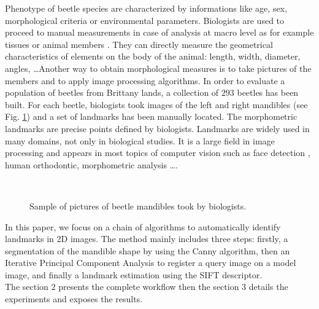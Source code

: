 \documentclass[twoside,twocolumn,10pt]{article}
\begin{document}
\copyrightspace
  Phenotype of beetle species are characterized by informations like
  age, sex, morphological criteria or environmental parameters. Biologists are
  used to proceed to manual measurements in case of
  analysis at macro level as for example tissues or animal members
  \cite{houle2003automated} \cite{bromiley2014semi}.
  They can directly measure the geometrical characteristics of elements on the body of the animal: length,
  width, diameter, angles, \ldots Another way to obtain morphological
  measures is to take pictures of the members and to apply image processing algorithms. In order to
  evaluate a population of beetles from Brittany lands, a collection of
  $293$ beetles has been built. For each beetle, biologists took images of the left
  and right mandibles (see Fig. \ref{figparts}) and a set of landmarks has been manually located. The
  morphometric landmarks are precise points defined by
  biologists. Landmarks are widely used in many domains, not only in
  biological studies. It is a large field in image processing
  \cite{li09} and
  appears in  most topics of computer vision such as face detection \cite{zhang2014facial},
  human orthodontic\cite{favaedi2010cephalometric}, morphometric
  analysis \cite{bec03} \ldots .

\begin{figure}[h]
\centering
{}~~
\caption{Sample of pictures of beetle mandibles took by biologists.}
\label{figparts}
\end{figure}

In this paper, we focus on a chain of algorithms to automatically identify  landmarks in 2D images. The method
mainly includes three steps: firstly, a segmentation of the mandible
shape by using the Canny algorithm, then an Iterative Principal
Component Analysis to register a query image on a model image, and
finally a landmark estimation using the SIFT descriptor.\\
The section $2$ presents the complete workflow then the section $3$ details the experiments and exposes the results.
\end{document}
